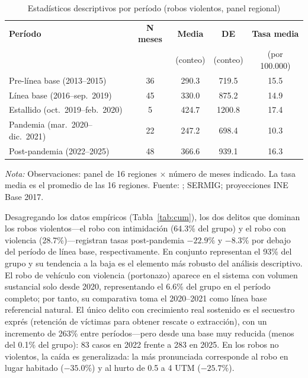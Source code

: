 \documentclass[12pt,a4paper]{article}
\newcommand{\tablenote}[1]{%
  \vspace{2pt}%
  \begin{minipage}{\linewidth}%
    \footnotesize\textit{Nota:} #1%
  \end{minipage}%
}
\begin{document}
\begin{table}[H]
\centering
\caption{Estad\'isticos descriptivos por per\'iodo (robos violentos, panel regional)}
\label{tab:descriptivo}
\small
\begin{tabular}{lcccc}
\toprule
\textbf{Per\'iodo} & \textbf{N meses} & \textbf{Media} & \textbf{DE} & \textbf{Tasa media} \\
 & & (conteo) & (conteo) & (por 100.000) \\
\midrule
Pre-l\'inea base (2013--2015)       & 36 & 290.3 & 719.5 & 15.5 \\
L\'inea base (2016--sep.\ 2019)     & 45 & 330.0 & 875.2 & 14.9 \\
Estallido (oct.\ 2019--feb.\ 2020)  &  5 & 424.7 & 1200.8 & 17.4 \\
Pandemia (mar.\ 2020--dic.\ 2021)   & 22 & 247.2 & 698.4 & 10.3 \\
Post-pandemia (2022--2025)          & 48 & 366.6 & 939.1 & 16.3 \\
\bottomrule
\end{tabular}
\tablenote{Observaciones: panel de 16 regiones $\times$ n\'umero de meses indicado.
La tasa media es el promedio de las 16 regiones. Fuente: \citet{INE2026};
SERMIG; proyecciones INE Base 2017.}
\end{table}

Desagregando los datos emp\'iricos (Tabla~\ref{tab:cum}), los dos delitos que dominan los robos
violentos---el robo con intimidaci\'on (64.3\% del grupo) y el robo con
violencia (28.7\%)---registran tasas post-pandemia $-22.9\%$ y $-8.3\%$ por debajo del
per\'iodo de l\'inea base, respectivamente. En conjunto representan el 93\% del grupo
y su tendencia a la baja es el elemento m\'as robusto del an\'alisis descriptivo. El
robo de veh\'iculo con violencia (portonazo) aparece en el sistema con volumen sustancial solo desde 2020,
representando el 6.6\% del grupo en el per\'iodo completo; por tanto, su comparativa toma el 2020--2021 como l\'inea base
referencial natural. El \'unico delito con
crecimiento real sostenido es el secuestro expr\'es (retenci\'on de v\'ictimas para obtener rescate o extracci\'on),
con un incremento de 263\% entre per\'iodos---pero desde una base muy reducida (menos
del 0.1\% del grupo): 83 casos en 2022 frente a 283 en 2025. En los robos no violentos,
la ca\'ida es generalizada: la m\'as pronunciada corresponde al robo en lugar habitado
($-35.0\%$) y al hurto de 0.5 a 4 UTM ($-25.7\%$).
\end{document}

